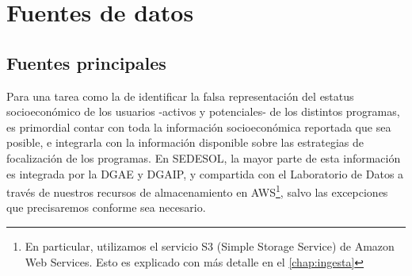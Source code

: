 \chapter*{Fuentes de datos}
\label{chap:fuentes}
\section*{Fuentes principales}
Para una tarea como la de identificar la falsa representación del estatus socioeconómico de los usuarios -activos y potenciales- de los distintos programas, es primordial contar con toda la información socioeconómica reportada que sea posible, e integrarla con la información disponible sobre las estrategias de focalización de los programas. En SEDESOL, la mayor parte de esta información es integrada por la DGAE y DGAIP, y compartida con el Laboratorio de Datos a través de nuestros recursos de almacenamiento en AWS\footnote{En particular, utilizamos el servicio S3 (Simple Storage Service) de Amazon Web Services. Esto es explicado con más detalle en el \autoref{chap:ingesta}}, salvo las excepciones que precisaremos conforme sea necesario.
